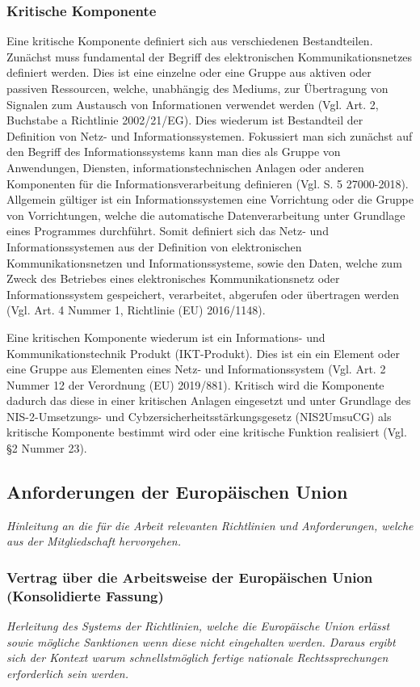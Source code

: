 \documentclass[11pt,a4paper]{article}   %
\begin{document}
            \subsubsection{Kritische Komponente}
            Eine kritische Komponente definiert sich aus verschiedenen Bestandteilen. Zunächst muss fundamental der Begriff des elektronischen Kommunikationsnetzes definiert werden. Dies ist eine einzelne oder eine Gruppe aus aktiven oder passiven Ressourcen, welche, unabhängig des Mediums, zur Übertragung von Signalen zum Austausch von Informationen verwendet werden (Vgl. Art. 2, Buchstabe a Richtlinie 2002/21/EG). Dies wiederum ist Bestandteil der Definition von Netz- und Informationssystemen. Fokussiert man sich zunächst auf den Begriff des Informationssystems kann man dies als Gruppe von Anwendungen, Diensten, informationstechnischen Anlagen oder anderen Komponenten für die Informationsverarbeitung definieren (Vgl. S. 5 27000-2018). Allgemein gültiger ist ein Informationssystemen eine Vorrichtung oder die Gruppe von Vorrichtungen, welche die automatische Datenverarbeitung unter Grundlage eines Programmes durchführt. Somit definiert sich das Netz- und Informationssystemen aus der Definition von elektronischen Kommunikationsnetzen und Informationssysteme, sowie den Daten, welche zum Zweck des Betriebes eines elektronisches Kommunikationsnetz oder Informationssystem gespeichert, verarbeitet, abgerufen oder übertragen werden (Vgl. Art. 4 Nummer 1, Richtlinie (EU) 2016/1148).

            Eine kritischen Komponente wiederum ist ein Informations- und Kommunikationstechnik Produkt (IKT-Produkt). Dies ist ein ein Element oder eine Gruppe aus Elementen eines Netz- und Informationssystem (Vgl. Art. 2  Nummer 12  der  Verordnung  (EU) 2019/881). Kritisch wird die Komponente dadurch das diese in einer kritischen Anlagen eingesetzt und unter Grundlage des NIS-2-Umsetzungs- und Cybzersicherheitsstärkungsgesetz (NIS2UmsuCG) als kritische Komponente bestimmt wird oder eine kritische Funktion realisiert (Vgl. §2 Nummer 23).
            
        \subsection{Anforderungen der Europäischen Union}
            \emph{Hinleitung an die für die Arbeit relevanten Richtlinien und Anforderungen, welche aus der Mitgliedschaft hervorgehen.}
            \subsubsection{Vertrag über die Arbeitsweise der Europäischen Union (Konsolidierte Fassung)}
                \emph{Herleitung des Systems der Richtlinien, welche die Europäische Union erlässt sowie mögliche Sanktionen wenn diese nicht eingehalten werden. Daraus ergibt sich der Kontext warum schnellstmöglich fertige nationale Rechtssprechungen erforderlich sein werden.}
\end{document}
